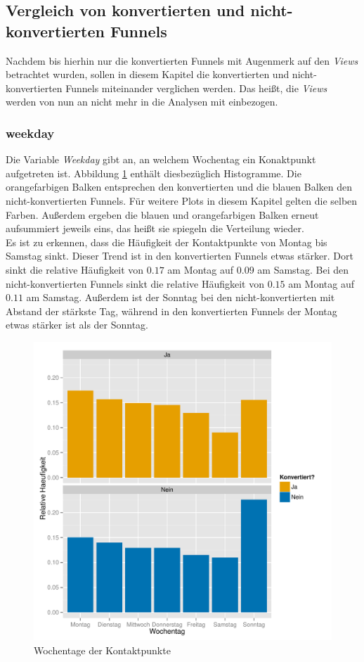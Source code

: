 \subsection{Vergleich von konvertierten und nicht-konvertierten Funnels}

Nachdem bis hierhin nur die konvertierten Funnels mit Augenmerk auf den \textit{Views} betrachtet wurden, sollen in diesem Kapitel die konvertierten und nicht-konvertierten Funnels miteinander verglichen werden. Das heißt, die \textit{Views} werden von nun an nicht mehr in die Analysen mit einbezogen.

\subsubsection*{weekday}
Die Variable \textit{Weekday} gibt an, an welchem Wochentag ein Konaktpunkt aufgetreten ist. Abbildung \ref{weekday} enthält diesbezüglich Histogramme. Die orangefarbigen Balken entsprechen den konvertierten und die blauen Balken den nicht-konvertierten Funnels. Für weitere Plots in diesem Kapitel gelten die selben Farben. Außerdem ergeben die blauen und orangefarbigen Balken erneut aufsummiert jeweils eins, das heißt sie spiegeln die Verteilung wieder.\\
Es ist zu erkennen, dass die Häufigkeit der Kontaktpunkte von Montag bis Samstag sinkt. Dieser Trend ist in den konvertierten Funnels etwas stärker. Dort sinkt die relative Häufigkeit von $ 0.17 $ am Montag auf $ 0.09 $ am Samstag. Bei den nicht-konvertierten Funnels sinkt die relative Häufigkeit von $ 0.15 $ am Montag auf $ 0.11 $ am Samstag. Außerdem ist der Sonntag bei den nicht-konvertierten mit Abstand der stärkste Tag, während in den konvertierten Funnels der Montag etwas stärker ist als der Sonntag.
\begin{figure}[H]
    \centering
    \includegraphics[scale=0.6]{weekday.pdf}
    \caption{Wochentage der Kontaktpunkte}
    \label{weekday}
\end{figure}

